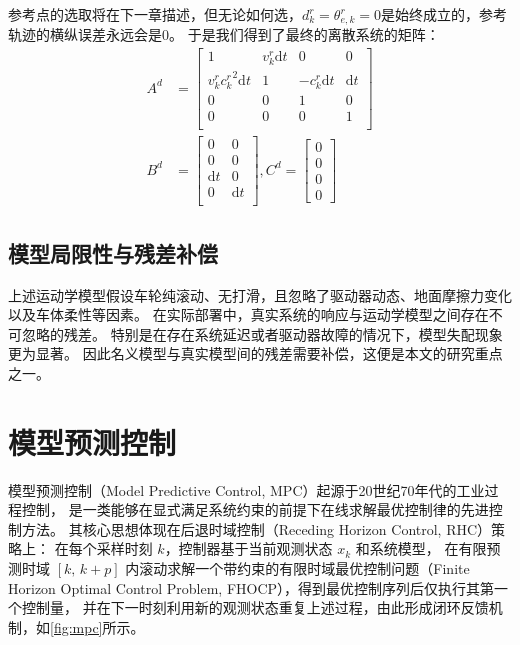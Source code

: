 参考点的选取将在下一章描述，但无论如何选，$d_k^r = \theta_{e,k}^r = 0$是始终成立的，参考轨迹的横纵误差永远会是0。
于是我们得到了最终的离散系统的矩阵：
\begin{equation}
    \label{equ:discrete_frenet}
    \begin{aligned}
        A^d &= 
        \begin{bmatrix}
            1 & v_k^r \mathrm{d}t & 0 & 0 \\
            v_k^r {c_k^r}^2 \mathrm{d}t & 1 & -c_k^r \mathrm{d}t & \mathrm{d}t \\
            0 & 0 & 1 & 0 \\
            0 & 0 & 0 & 1 \\
        \end{bmatrix} \\
        B^d &= 
        \begin{bmatrix}
            0 & 0 \\
            0 & 0 \\
            \mathrm{d}t & 0 \\
            0 & \mathrm{d}t \\
        \end{bmatrix},
        C^d = 
        \begin{bmatrix}
            0 \\ 0 \\ 0 \\ 0
        \end{bmatrix}
    \end{aligned}
\end{equation}

\subsection{模型局限性与残差补偿}

上述运动学模型假设车轮纯滚动、无打滑，且忽略了驱动器动态、地面摩擦力变化以及车体柔性等因素。
在实际部署中，真实系统的响应与运动学模型之间存在不可忽略的残差。
特别是在存在系统延迟或者驱动器故障的情况下，模型失配现象更为显著。
因此名义模型与真实模型间的残差需要补偿，这便是本文的研究重点之一。

\section{模型预测控制}

模型预测控制（Model Predictive Control, MPC）起源于20世纪70年代的工业过程控制，
是一类能够在显式满足系统约束的前提下在线求解最优控制律的先进控制方法\cite{review_mpc}。
其核心思想体现在后退时域控制（Receding Horizon Control, RHC）策略上：
在每个采样时刻 $k$，控制器基于当前观测状态 $x_k$ 和系统模型，
在有限预测时域 $[k,\, k+p]$ 内滚动求解一个带约束的有限时域最优控制问题（Finite Horizon
Optimal Control Problem, FHOCP），得到最优控制序列后仅执行其第一个控制量，
并在下一时刻利用新的观测状态重复上述过程，由此形成闭环反馈机制，如\autoref{fig:mpc}所示。


